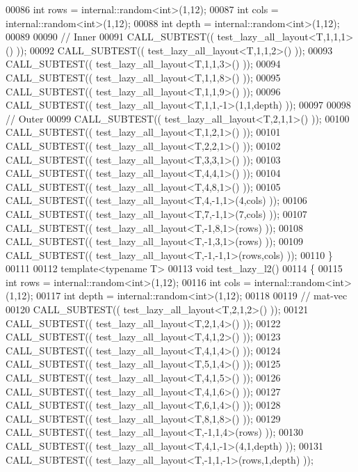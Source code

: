 \begin{DoxyCode}
00086   \textcolor{keywordtype}{int} rows = internal::random<int>(1,12);
00087   \textcolor{keywordtype}{int} cols = internal::random<int>(1,12);
00088   \textcolor{keywordtype}{int} depth = internal::random<int>(1,12);
00089 
00090   \textcolor{comment}{// Inner}
00091   CALL\_SUBTEST(( test\_lazy\_all\_layout<T,1,1,1>() ));
00092   CALL\_SUBTEST(( test\_lazy\_all\_layout<T,1,1,2>() ));
00093   CALL\_SUBTEST(( test\_lazy\_all\_layout<T,1,1,3>() ));
00094   CALL\_SUBTEST(( test\_lazy\_all\_layout<T,1,1,8>() ));
00095   CALL\_SUBTEST(( test\_lazy\_all\_layout<T,1,1,9>() ));
00096   CALL\_SUBTEST(( test\_lazy\_all\_layout<T,1,1,-1>(1,1,depth) ));
00097 
00098   \textcolor{comment}{// Outer}
00099   CALL\_SUBTEST(( test\_lazy\_all\_layout<T,2,1,1>() ));
00100   CALL\_SUBTEST(( test\_lazy\_all\_layout<T,1,2,1>() ));
00101   CALL\_SUBTEST(( test\_lazy\_all\_layout<T,2,2,1>() ));
00102   CALL\_SUBTEST(( test\_lazy\_all\_layout<T,3,3,1>() ));
00103   CALL\_SUBTEST(( test\_lazy\_all\_layout<T,4,4,1>() ));
00104   CALL\_SUBTEST(( test\_lazy\_all\_layout<T,4,8,1>() ));
00105   CALL\_SUBTEST(( test\_lazy\_all\_layout<T,4,-1,1>(4,cols) ));
00106   CALL\_SUBTEST(( test\_lazy\_all\_layout<T,7,-1,1>(7,cols) ));
00107   CALL\_SUBTEST(( test\_lazy\_all\_layout<T,-1,8,1>(rows) ));
00108   CALL\_SUBTEST(( test\_lazy\_all\_layout<T,-1,3,1>(rows) ));
00109   CALL\_SUBTEST(( test\_lazy\_all\_layout<T,-1,-1,1>(rows,cols) ));
00110 \}
00111 
00112 \textcolor{keyword}{template}<\textcolor{keyword}{typename} T>
00113 \textcolor{keywordtype}{void} test\_lazy\_l2()
00114 \{
00115   \textcolor{keywordtype}{int} rows = internal::random<int>(1,12);
00116   \textcolor{keywordtype}{int} cols = internal::random<int>(1,12);
00117   \textcolor{keywordtype}{int} depth = internal::random<int>(1,12);
00118 
00119   \textcolor{comment}{// mat-vec}
00120   CALL\_SUBTEST(( test\_lazy\_all\_layout<T,2,1,2>() ));
00121   CALL\_SUBTEST(( test\_lazy\_all\_layout<T,2,1,4>() ));
00122   CALL\_SUBTEST(( test\_lazy\_all\_layout<T,4,1,2>() ));
00123   CALL\_SUBTEST(( test\_lazy\_all\_layout<T,4,1,4>() ));
00124   CALL\_SUBTEST(( test\_lazy\_all\_layout<T,5,1,4>() ));
00125   CALL\_SUBTEST(( test\_lazy\_all\_layout<T,4,1,5>() ));
00126   CALL\_SUBTEST(( test\_lazy\_all\_layout<T,4,1,6>() ));
00127   CALL\_SUBTEST(( test\_lazy\_all\_layout<T,6,1,4>() ));
00128   CALL\_SUBTEST(( test\_lazy\_all\_layout<T,8,1,8>() ));
00129   CALL\_SUBTEST(( test\_lazy\_all\_layout<T,-1,1,4>(rows) ));
00130   CALL\_SUBTEST(( test\_lazy\_all\_layout<T,4,1,-1>(4,1,depth) ));
00131   CALL\_SUBTEST(( test\_lazy\_all\_layout<T,-1,1,-1>(rows,1,depth) ));

\end{DoxyCode}
